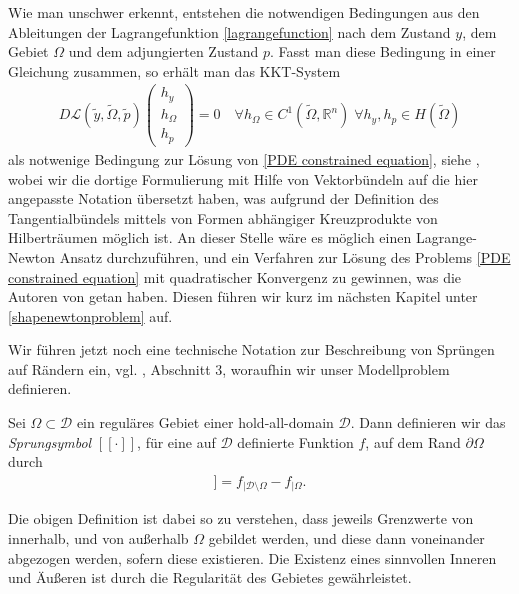 Wie man unschwer erkennt, entstehen die notwendigen Bedingungen aus den Ableitungen der Lagrangefunktion \ref{lagrangefunction} nach dem Zustand $y$, dem Gebiet $\Omega$ und dem adjungierten Zustand $p$. Fasst man diese Bedingung in einer Gleichung zusammen, so erhält man das KKT-System
\begin{equation}
\label{KKT}
\begin{aligned}
	D\mathcal{L}(\tilde{y},\tilde{\Omega},\tilde{p})\left(
	\begin{matrix}
	h_y \\
	h_{\Omega} \\
	h_p
	\end{matrix}\right)	 = 0 \quad \forall h_{\Omega} \in C^{1}(\tilde{\Omega},\mathbb{R}^n)\;
	\forall h_y, h_p \in H(\tilde{\Omega})
\end{aligned}
\end{equation}
als notwenige Bedingung zur Lösung von \ref{PDE constrained equation}, siehe \cite{LagrangeNewton}, wobei wir die dortige Formulierung mit Hilfe von Vektorbündeln auf die hier angepasste Notation übersetzt haben, was aufgrund der Definition des Tangentialbündels mittels von Formen abhängiger Kreuzprodukte von Hilberträumen  möglich ist. An dieser Stelle wäre es möglich einen Lagrange-Newton Ansatz durchzuführen, und ein Verfahren zur Lösung des Problems \ref{PDE constrained equation} mit quadratischer Konvergenz zu gewinnen, was die Autoren von \cite{LagrangeNewton} getan haben. Diesen führen wir kurz im nächsten Kapitel unter \ref{shapenewtonproblem} auf.

Wir führen jetzt noch eine technische Notation zur Beschreibung von Sprüngen auf Rändern ein, vgl. \cite{LagrangeNewton}, Abschnitt 3, woraufhin wir unser Modellproblem definieren.

\begin{defi}
	Sei $\Omega \subset \mathcal{D}$ ein reguläres Gebiet einer hold-all-domain $\mathcal{D}$. Dann definieren wir das \textit{Sprungsymbol} $[[\cdot]]$, für eine auf $\mathcal{D}$ definierte Funktion $f$, auf dem Rand $\partial\Omega$ durch
	\begin{align*}
		[[f]] = f_{\vert \mathcal{D} \setminus \Omega} - f_{\vert \Omega}.
	\end{align*}
\end{defi}

Die obigen Definition ist dabei so zu verstehen, dass jeweils Grenzwerte von innerhalb, und von außerhalb $\Omega$ gebildet werden, und diese dann voneinander abgezogen werden, sofern diese existieren. Die Existenz eines sinnvollen Inneren und Äußeren ist durch die Regularität des Gebietes gewährleistet.

